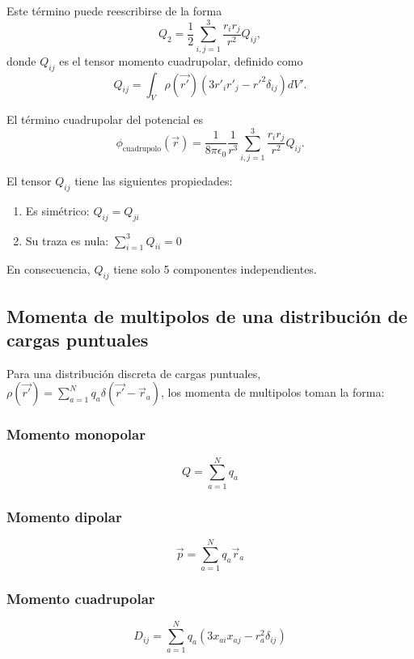 \documentclass[12pt,a4paper]{book}
\begin{document}
Este término puede reescribirse de la forma
\begin{equation}
Q_2 = \frac{1}{2}\sum_{i,j=1}^{3}\frac{r_i r_j}{r^2}Q_{ij},
\end{equation}
donde $Q_{ij}$ es el tensor momento cuadrupolar, definido como
\begin{equation}
Q_{ij} = \int_V \rho(\vec{r'})(3r'_i r'_j - r'^2\delta_{ij}) dV'.
\end{equation}

El término cuadrupolar del potencial es
\begin{equation}
\phi_{\text{cuadrupolo}}(\vec{r}) = \frac{1}{8\pi\epsilon_0}\frac{1}{r^3}\sum_{i,j=1}^{3}\frac{r_i r_j}{r^2}Q_{ij}.
\end{equation}

El tensor $Q_{ij}$ tiene las siguientes propiedades:
\begin{enumerate}
\item Es simétrico: $Q_{ij} = Q_{ji}$
\item Su traza es nula: $\sum_{i=1}^{3}Q_{ii} = 0$
\end{enumerate}

En consecuencia, $Q_{ij}$ tiene solo 5 componentes independientes.

\subsection{Momenta de multipolos de una distribución de cargas puntuales}

Para una distribución discreta de cargas puntuales, $\rho(\vec{r'}) = \sum_{a=1}^{N} q_a \delta(\vec{r'} - \vec{r}_a)$, los momenta de multipolos toman la forma:

\subsubsection{Momento monopolar}
\begin{equation}
Q = \sum_{a=1}^{N} q_a
\end{equation}

\subsubsection{Momento dipolar}
\begin{equation}
\vec{p} = \sum_{a=1}^{N} q_a \vec{r}_a
\end{equation}

\subsubsection{Momento cuadrupolar}
\begin{equation}
D_{ij} = \sum_{a=1}^{N} q_a (3x_{ai} x_{aj} - r_a^2\delta_{ij})
\end{equation}
\end{document}
